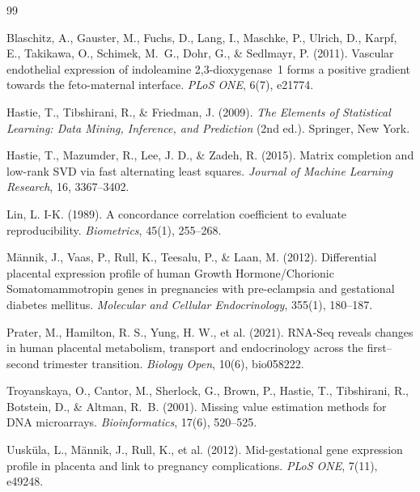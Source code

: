 \documentclass[11pt,a4paper]{article}
\begin{document}
\begin{thebibliography}{99}

Blaschitz, A., Gauster, M., Fuchs, D., Lang, I., Maschke, P.,
Ulrich, D., Karpf, E., Takikawa, O., Schimek, M.~G., Dohr, G.,
\& Sedlmayr, P. (2011). Vascular endothelial expression of
indoleamine 2,3-dioxygenase~1 forms a positive gradient towards
the feto-maternal interface. \emph{PLoS ONE}, 6(7), e21774.

Hastie, T., Tibshirani, R., \& Friedman, J. (2009).
\emph{The Elements of Statistical Learning: Data Mining,
Inference, and Prediction} (2nd ed.). Springer, New York.

Hastie, T., Mazumder, R., Lee, J. D., \& Zadeh, R. (2015).
Matrix completion and low-rank SVD via fast alternating least
squares. \emph{Journal of Machine Learning Research}, 16,
3367--3402.

Lin, L. I-K. (1989). A concordance correlation coefficient to
evaluate reproducibility. \emph{Biometrics}, 45(1), 255--268.

M\"{a}nnik, J., Vaas, P., Rull, K., Teesalu, P., \& Laan, M.
(2012). Differential placental expression profile of human Growth
Hormone/Chorionic Somatomammotropin genes in pregnancies with
pre-eclampsia and gestational diabetes mellitus. \emph{Molecular
and Cellular Endocrinology}, 355(1), 180--187.

Prater, M., Hamilton, R. S., Yung, H. W., et al. (2021).
RNA-Seq reveals changes in human placental metabolism, transport
and endocrinology across the first--second trimester transition.
\emph{Biology Open}, 10(6), bio058222.

Troyanskaya, O., Cantor, M., Sherlock, G., Brown, P., Hastie,
T., Tibshirani, R., Botstein, D., \& Altman, R.~B. (2001).
Missing value estimation methods for DNA microarrays.
\emph{Bioinformatics}, 17(6), 520--525.

Uusk\"{u}la, L., M\"{a}nnik, J., Rull, K., et al. (2012).
Mid-gestational gene expression profile in placenta and link to
pregnancy complications. \emph{PLoS ONE}, 7(11), e49248.


\end{thebibliography}
\end{document}
